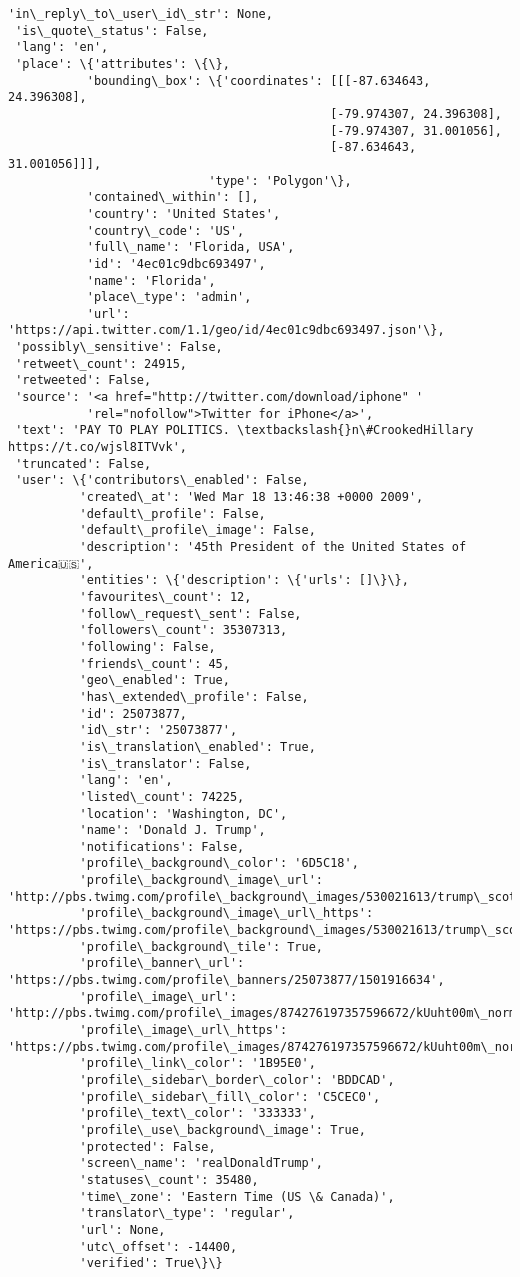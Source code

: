 \documentclass[11pt]{article}
\begin{document}
\begin{Verbatim}[commandchars=\\\{\}]
 'in\_reply\_to\_user\_id\_str': None,
 'is\_quote\_status': False,
 'lang': 'en',
 'place': \{'attributes': \{\},
           'bounding\_box': \{'coordinates': [[[-87.634643, 24.396308],
                                             [-79.974307, 24.396308],
                                             [-79.974307, 31.001056],
                                             [-87.634643, 31.001056]]],
                            'type': 'Polygon'\},
           'contained\_within': [],
           'country': 'United States',
           'country\_code': 'US',
           'full\_name': 'Florida, USA',
           'id': '4ec01c9dbc693497',
           'name': 'Florida',
           'place\_type': 'admin',
           'url': 'https://api.twitter.com/1.1/geo/id/4ec01c9dbc693497.json'\},
 'possibly\_sensitive': False,
 'retweet\_count': 24915,
 'retweeted': False,
 'source': '<a href="http://twitter.com/download/iphone" '
           'rel="nofollow">Twitter for iPhone</a>',
 'text': 'PAY TO PLAY POLITICS. \textbackslash{}n\#CrookedHillary https://t.co/wjsl8ITVvk',
 'truncated': False,
 'user': \{'contributors\_enabled': False,
          'created\_at': 'Wed Mar 18 13:46:38 +0000 2009',
          'default\_profile': False,
          'default\_profile\_image': False,
          'description': '45th President of the United States of America🇺🇸',
          'entities': \{'description': \{'urls': []\}\},
          'favourites\_count': 12,
          'follow\_request\_sent': False,
          'followers\_count': 35307313,
          'following': False,
          'friends\_count': 45,
          'geo\_enabled': True,
          'has\_extended\_profile': False,
          'id': 25073877,
          'id\_str': '25073877',
          'is\_translation\_enabled': True,
          'is\_translator': False,
          'lang': 'en',
          'listed\_count': 74225,
          'location': 'Washington, DC',
          'name': 'Donald J. Trump',
          'notifications': False,
          'profile\_background\_color': '6D5C18',
          'profile\_background\_image\_url': 'http://pbs.twimg.com/profile\_background\_images/530021613/trump\_scotland\_\_43\_of\_70\_cc.jpg',
          'profile\_background\_image\_url\_https': 'https://pbs.twimg.com/profile\_background\_images/530021613/trump\_scotland\_\_43\_of\_70\_cc.jpg',
          'profile\_background\_tile': True,
          'profile\_banner\_url': 'https://pbs.twimg.com/profile\_banners/25073877/1501916634',
          'profile\_image\_url': 'http://pbs.twimg.com/profile\_images/874276197357596672/kUuht00m\_normal.jpg',
          'profile\_image\_url\_https': 'https://pbs.twimg.com/profile\_images/874276197357596672/kUuht00m\_normal.jpg',
          'profile\_link\_color': '1B95E0',
          'profile\_sidebar\_border\_color': 'BDDCAD',
          'profile\_sidebar\_fill\_color': 'C5CEC0',
          'profile\_text\_color': '333333',
          'profile\_use\_background\_image': True,
          'protected': False,
          'screen\_name': 'realDonaldTrump',
          'statuses\_count': 35480,
          'time\_zone': 'Eastern Time (US \& Canada)',
          'translator\_type': 'regular',
          'url': None,
          'utc\_offset': -14400,
          'verified': True\}\}


\end{Verbatim}
\end{document}
